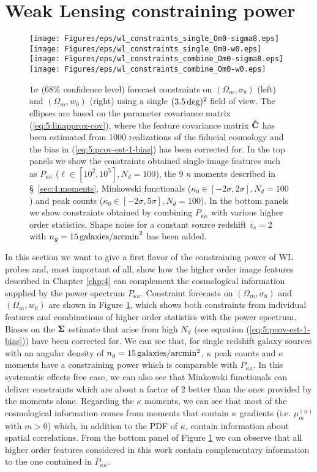 \section{Weak Lensing constraining power}
\label{sec:5:constraints}
%
\begin{figure}
\begin{center}
\texttt{[image: Figures/eps/wl\_constraints\_single\_Om0-sigma8.eps]} \texttt{[image: Figures/eps/wl\_constraints\_single\_Om0-w0.eps]}
\texttt{[image: Figures/eps/wl\_constraints\_combine\_Om0-sigma8.eps]} \texttt{[image: Figures/eps/wl\_constraints\_combine\_Om0-w0.eps]}
\end{center}
\caption{$1\sigma$ (68\% confidence level) forecast constraints on $(\Omega_m,\sigma_8)$ (left) and $(\Omega_m,w_0)$ (right) using a single $(3.5\,{\rm deg})^2$ field of view. The ellipses are based on the parameter covariance matrix (\ref{eq:5:linapprox-cov}), where the feature covariance matrix $\mathbf{\hat{C}}$ has been estimated from 1000 realizations of the fiducial cosmology and the bias in (\ref{eq:5:pcov-est-1-bias}) has been corrected for. In the top panels we show the constraints obtained single image features such as $P_{\kappa\kappa}$ ($\ell \in [10^2,10^5],N_d=100$), the 9 $\kappa$ moments described in \S~\ref{sec:4:moments}, Minkowski functionals ($\kappa_0\in[-2\sigma,2\sigma], N_d=100$) and peak counts ($\kappa_0\in[-2\sigma,5\sigma], N_d=100$). In the bottom panels we show constraints obtained by combining $P_{\kappa\kappa}$ with various higher order statistics. Shape noise for a constant source redshift $z_s=2$ with $n_g=15\,{\rm galaxies/arcmin}^2$ has been added.}
\label{fig:5:wlconstraints}
\end{figure}
%
In this section we want to give a first flavor of the constraining power of WL probes and, most important of all, show how the higher order image features described in Chapter \ref{chp:4} can complement the cosmological information supplied by the power spectrum $P_{\kappa\kappa}$. Constraint forecasts on $(\Omega_m,\sigma_8)$ and $(\Omega_m,w_0)$ are shown in Figure \ref{fig:5:wlconstraints}, which shows both constraints from individual features and combinations of higher order statistics with the power spectrum. Biases on the $\mathbf{\Sigma}$ estimate that arise from high $N_d$ (see equation (\ref{eq:5:pcov-est-1-bias})) have been corrected for. We can see that, for single redshift galaxy sources with an angular density of $n_g=15\,{\rm galaxies/arcmin^2}$, $\kappa$ peak counts and $\kappa$ moments have a constraining power which is comparable with $P_{\kappa\kappa}$. In this systematic effects free case, we can also see that Minkowski functionals can deliver constraints which are about a factor of 2 better than the ones provided by the moments alone.
Regarding the $\kappa$ moments, we can see that most of the cosmological information comes from moments that contain $\kappa$ gradients (i.e. $\mu_{m}^{(n)}$ with $m>0$) which, in addition to the PDF of $\kappa$, contain information about spatial correlations. 
From the bottom panel of Figure \ref{fig:5:wlconstraints} we can observe that all higher order features considered in this work contain complementary information to the one contained in $P_{\kappa\kappa}$.    

%